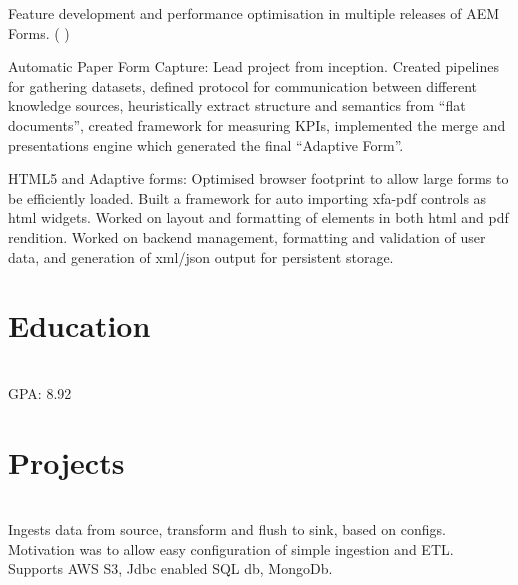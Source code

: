\documentclass[]{deedy-resume-openfont}
\begin{document}
\sectionsep
{}\hfill {}
\begin{tightemize}
	\item Feature development and performance optimisation in multiple releases of AEM Forms. \newline (
		{}
	)
	\item Automatic Paper Form Capture: Lead project from inception. Created pipelines for gathering datasets, defined protocol for communication between different knowledge sources, heuristically extract structure and semantics from “ﬂat documents”, created framework for measuring KPIs, implemented the merge and presentations engine which generated the final “Adaptive Form”.
	\item HTML5 and Adaptive forms: Optimised browser footprint to allow large forms to be efficiently loaded. Built a framework for auto importing xfa-pdf controls as html widgets. Worked on layout and formatting of elements in both html and pdf rendition. Worked on backend management, formatting and validation of user data, and generation of xml/json output for persistent storage.
\end{tightemize}
\sectionsep
%
%
\section{Education}
\raggedright

\hfill {}\\
GPA: 8.92\\
\sectionsep

%
%
\section{Projects}
\raggedright

\hfill {}\\
Ingests data from source, transform and flush to sink, based on configs. Motivation was to allow easy configuration of simple ingestion and ETL. Supports AWS S3, Jdbc enabled SQL db, MongoDb.\\
\sectionsep
  
\end{document}

